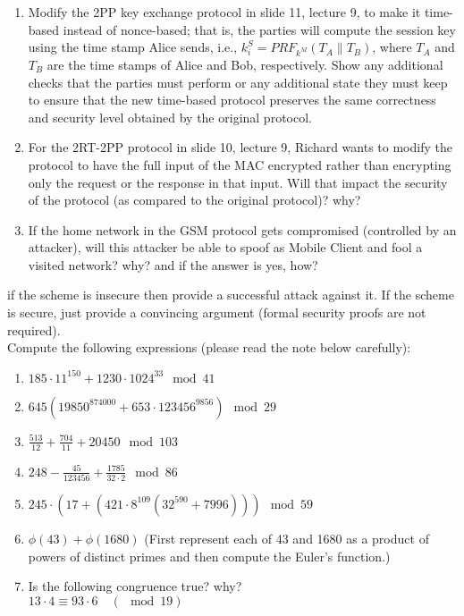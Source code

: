 \documentclass[12pt]{article}
\newcommand*\concat{\mathbin{\|}}
\begin{document}
\begin{enumerate}
    \item Modify the 2PP key exchange protocol in slide 11, lecture 9, to make it time-based instead of nonce-based; that is, the parties will compute the session key using the time stamp Alice sends, i.e., $k_i^S = PRF_{k^M}(T_A \concat T_B)$, where $T_A$ and $T_B$ are the time stamps of Alice and Bob, respectively. Show any additional checks that the parties must perform or any additional state they must keep to ensure that the new time-based protocol preserves the same correctness and security level obtained by the original protocol.
    
    \item For the 2RT-2PP protocol in slide 10, lecture 9, Richard wants to modify the protocol to have the full input of the MAC encrypted rather than encrypting only the request or the response in that input. Will that impact the security of the protocol (as compared to the original protocol)? why? 
    
    \item If the home network in the GSM protocol gets compromised (controlled by an attacker), will this attacker be able to spoof as Mobile Client and fool a visited network? why? and if the answer is yes, how? 
\end{enumerate}


 if the scheme is insecure then provide a successful attack against it. If the scheme is secure, just provide a convincing argument (formal security proofs are not required). \\

Compute the following expressions (please read the note below carefully):
\begin{enumerate}
    \item $185 \cdot 11^{150} + 1230 \cdot 1024^{33} \mod 41$
    
    \item $645(19850^{874000} + 653 \cdot 123456^{9856}) \mod 29$
    
    \item $\frac{513}{12} + \frac{704}{11} + 20450 \mod 103$
    
    \item $248 - \frac{45}{123456} + \frac{1785}{32 \cdot 2} \mod 86$
    
    \item $245 \cdot (17 + (421 \cdot 8^{109} (32^{590} + 7996))) \mod 59$
    
    \item $\phi(43) + \phi(1680)$ (First represent each of 43 and 1680 as a product of powers of distinct primes and then compute the Euler's function.)
    
    \item Is the following congruence true? why? \\
    $13 \cdot 4 \equiv 93 \cdot 6 \quad (\mod 19)$
\end{enumerate}
\end{document}
